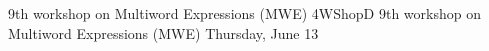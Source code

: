 \begin{wsschedule}
{9th workshop on Multiword Expressions (MWE)}
{4}{WShopD}
{9th workshop on Multiword Expressions (MWE)}
{Thursday, June 13}{\WShopLocD}

\end{wsschedule}
